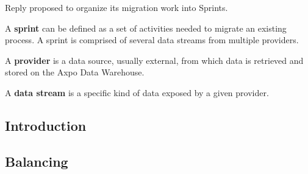 \label{section:sprints}
Reply proposed to organize its migration work into Sprints.

A \textbf{sprint} can be defined as a set of activities needed to migrate an existing process.
A sprint is comprised of several data streams from multiple providers.

A \textbf{provider} is a data source, usually external, from which data is retrieved and stored on the Axpo Data Warehouse.

A \textbf{data stream} is a specific kind of data exposed by a given provider.

\subsection{Introduction}
    
    
\subsection{Balancing}
    
    